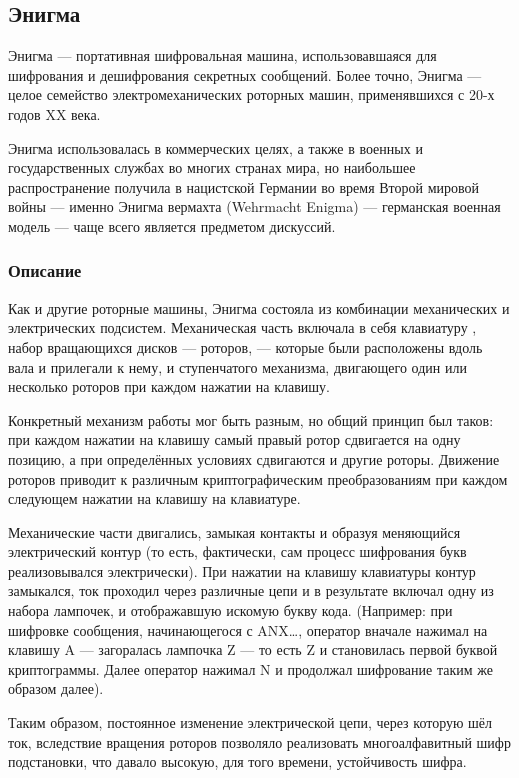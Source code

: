 \subsection{Энигма}
Энигма — портативная шифровальная машина, использовавшаяся для шифрования 
и дешифрования секретных сообщений. Более точно, Энигма — целое семейство 
электромеханических роторных машин, применявшихся с 20-х годов XX 
века.

Энигма использовалась в коммерческих целях, а также в военных и государственных 
службах во многих странах мира, но наибольшее распространение получила 
в нацистской Германии во время Второй мировой войны — именно Энигма 
вермахта (Wehrmacht Enigma) — германская военная модель — чаще всего 
является предметом дискуссий.

\subsubsection{Описание}
Как и другие роторные машины, Энигма состояла из комбинации механических 
и электрических подсистем. Механическая часть включала в себя клавиатуру
, набор вращающихся дисков — роторов, — которые были расположены вдоль 
вала и прилегали к нему, и ступенчатого механизма, двигающего один 
или несколько роторов при каждом нажатии на клавишу.

Конкретный механизм работы мог быть разным, но общий принцип был таков: 
при каждом нажатии на клавишу самый правый ротор сдвигается на одну 
позицию, а при определённых условиях сдвигаются и другие роторы. Движение 
роторов приводит к различным криптографическим преобразованиям при 
каждом следующем нажатии на клавишу на клавиатуре.

Механические части двигались, замыкая контакты и образуя меняющийся 
электрический контур (то есть, фактически, сам процесс шифрования 
букв реализовывался электрически). При нажатии на клавишу клавиатуры 
контур замыкался, ток проходил через различные цепи и в результате 
включал одну из набора лампочек, и отображавшую искомую букву кода.
(Например: при шифровке сообщения, начинающегося с ANX…, оператор 
вначале нажимал на клавишу A — загоралась лампочка Z — то есть Z и 
становилась первой буквой криптограммы. Далее оператор нажимал N и 
продолжал шифрование таким же образом далее).

Таким образом, постоянное изменение электрической цепи, через которую 
шёл ток, вследствие вращения роторов позволяло реализовать многоалфавитный 
шифр подстановки, что давало высокую, для того времени, устойчивость шифра.

